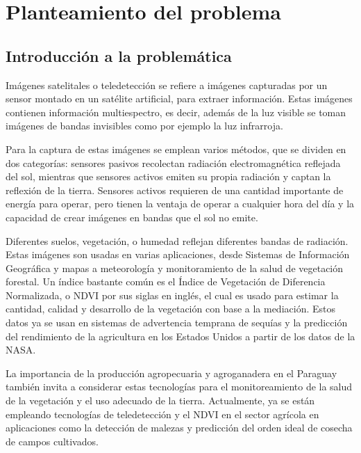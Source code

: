 \section{Planteamiento del problema}

\subsection{Introducción a la problemática}

Imágenes satelitales o teledetección se refiere a imágenes capturadas por un sensor montado en un satélite artificial, para extraer información. Estas imágenes contienen información multiespectro, es decir, además de la luz visible se toman imágenes de bandas invisibles como por ejemplo la luz infrarroja. \autocite{globalforestlink-how-sat-imaging-work}

Para la captura de estas imágenes se emplean varios métodos, que se dividen en dos categorías: sensores pasivos recolectan radiación electromagnética reflejada del sol, mientras que sensores activos emiten su propia radiación y captan la reflexión de la tierra. Sensores activos requieren de una cantidad importante de energía para operar, pero tienen la ventaja de operar a cualquier hora del día y la capacidad de crear imágenes en bandas que el sol no emite. \autocite{globalforestlink-how-sat-imaging-work}

Diferentes suelos, vegetación, o humedad reflejan diferentes bandas de radiación. Estas imágenes son usadas en varias aplicaciones, desde Sistemas de Información Geográfica y mapas a meteorología y monitoramiento de la salud de vegetación forestal. Un índice bastante común es el Índice de Vegetación de Diferencia Normalizada, o NDVI por sus siglas en inglés, el cual es usado para estimar la cantidad, calidad y desarrollo de la vegetación con base a la mediación. Estos datos ya se usan en sistemas de advertencia temprana de sequías y la predicción del rendimiento de la agricultura en los Estados Unidos a partir de los datos de la NASA. \autocite{earthdata-vegetation}

La importancia de la producción agropecuaria y agroganadera en el Paraguay también invita a considerar estas tecnologías para el monitoreamiento de la salud de la vegetación y el uso adecuado de la tierra. Actualmente, ya se están empleando tecnologías de teledetección y el NDVI en el sector agrícola en aplicaciones como la detección de malezas y predicción del orden ideal de cosecha de campos cultivados. \autocite{onesoil-agricultura-paraguay}

